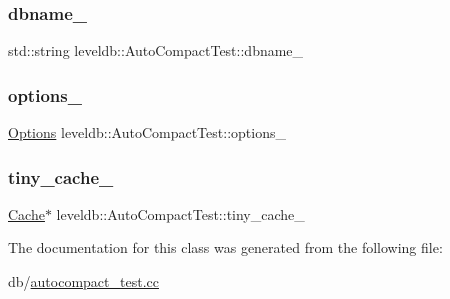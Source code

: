 \subsubsection{\texorpdfstring{dbname\_}{dbname\_}}
{\footnotesize\ttfamily std\+::string leveldb\+::\+Auto\+Compact\+Test\+::dbname\+\_\+}

\mbox{\label{classleveldb_1_1_auto_compact_test_ad7f1f35214065627e4cadd0468d22c21}} 
\subsubsection{\texorpdfstring{options\_}{options\_}}
{\footnotesize\ttfamily \mbox{\hyperlink{structleveldb_1_1_options}{Options}} leveldb\+::\+Auto\+Compact\+Test\+::options\+\_\+}

\mbox{\label{classleveldb_1_1_auto_compact_test_a189cb5733d861b7df8c3bf945180afe5}} 
\subsubsection{\texorpdfstring{tiny\_cache\_}{tiny\_cache\_}}
{\footnotesize\ttfamily \mbox{\hyperlink{classleveldb_1_1_cache}{Cache}}$\ast$ leveldb\+::\+Auto\+Compact\+Test\+::tiny\+\_\+cache\+\_\+}



The documentation for this class was generated from the following file\+:\begin{DoxyCompactItemize}
\item 
db/\mbox{\hyperlink{autocompact__test_8cc}{autocompact\+\_\+test.\+cc}}\end{DoxyCompactItemize}
